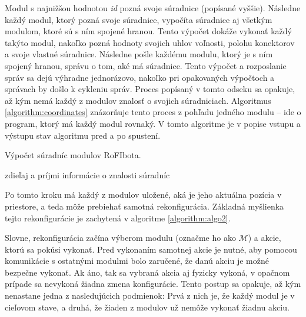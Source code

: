 \documentclass[
  printed, %
  oneside, %
  notable,   %
  nolof,     %
  nolot,     %
]{fithesis3}
\begin{document}
Modul s najnižšou hodnotou \textit{id} pozná svoje súradnice (popísané vyššie). Následne každý modul, ktorý pozná svoje súradnice, vypočíta súradnice aj všetkým modulom, ktoré sú s ním spojené hranou. Tento výpočet dokáže vykonať každý takýto modul, nakoľko pozná hodnoty svojich uhlov voľnosti, polohu konektorov a svoje vlastné súradnice. Následne pošle každému modulu, ktorý je s ním spojený hranou, správu o tom, aké má súradnice. Tento výpočet a rozposlanie správ sa dejú výhradne jednorázovo, nakoľko pri opakovaných výpočtoch a správach by došlo k cykleniu správ. Proces popísaný v tomto odseku sa opakuje, až kým nemá každý z modulov znalosť o svojich súradniciach. Algoritmus \ref{algorithm:coordinates} znázorňuje tento proces z pohľadu jedného modulu -- ide o program, ktorý má každý modul rovnaký. V tomto algoritme je v popise vstupu a výstupu stav algoritmu pred a po spustení. 

\begin{algorithm}
    \caption{Výpočet súradníc modulov RoFIbota. }
    \label{algorithm:coordinates}
    
    \DontPrintSemicolon
    
    zdieľaj a príjmi informácie o znalosti súradníc\;
\end{algorithm}

Po tomto kroku má každý z modulov uložené, aká je jeho aktuálna pozícia v priestore, a teda môže prebiehať samotná rekonfigurácia. Základná myšlienka tejto rekonfigurácie je zachytená v algoritme \ref{algorithm:algo2}. 

Slovne, rekonfigurácia začína výberom modulu (označme ho ako $\mathcal{M}$) a akcie, ktorú sa pokúsi vykonať. Pred vykonaním samotnej akcie je nutné, aby pomocou komunikácie s ostatnými modulmi bolo zaručené, že danú akciu je možné bezpečne vykonať. Ak áno, tak sa vybraná akcia aj fyzicky vykoná, v opačnom prípade sa nevykoná žiadna zmena konfigurácie. Tento postup sa opakuje, až kým nenastane jedna z nasledujúcich podmienok: Prvá z nich je, že každý modul je v cieľovom stave, a druhá, že žiaden z modulov už nemôže vykonať žiadnu akciu. 
\end{document}
